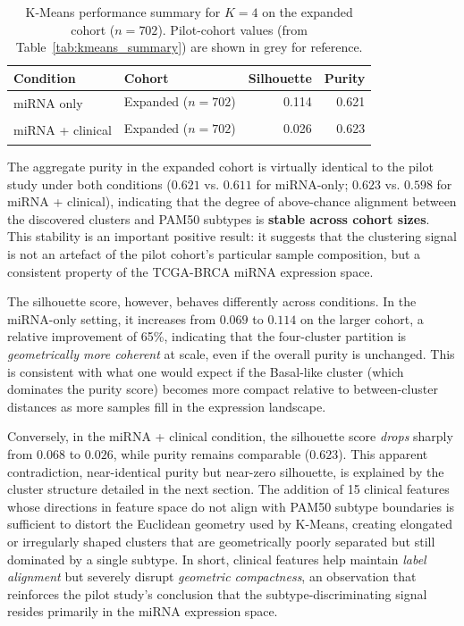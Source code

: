 \begin{table}[!ht]
\centering
\caption{K-Means performance summary for $K = 4$ on the expanded cohort ($n = 702$).
Pilot-cohort values (from Table~\ref{tab:kmeans_summary}) are shown in grey for
reference.}
\label{tab:kmeans_expanded_summary}
\begin{tabular}{llrr}
\hline
\textbf{Condition} & \textbf{Cohort} & \textbf{Silhouette} & \textbf{Purity} \\
\hline
\multirow{2}{*}{miRNA only}
  & Expanded ($n = 702$) & 0.114 & 0.621 \\
  & \color{gray}{Pilot ($n = 244$)}  & \color{gray}{0.069} & \color{gray}{0.611} \\
\hline
\multirow{2}{*}{miRNA + clinical}
  & Expanded ($n = 702$) & 0.026 & 0.623 \\
  & \color{gray}{Pilot ($n = 244$)}  & \color{gray}{0.068} & \color{gray}{0.598} \\
\hline
\end{tabular}
\end{table}


The aggregate purity in the expanded cohort is virtually identical to the pilot
study under both conditions ($0.621$ vs. $0.611$ for miRNA-only; $0.623$ vs.
$0.598$ for miRNA + clinical), indicating that the degree of above-chance alignment
between the discovered clusters and PAM50 subtypes is \textbf{stable across cohort
sizes}. This stability is an important positive result: it suggests that the
clustering signal is not an artefact of the pilot cohort's particular sample
composition, but a consistent property of the TCGA-BRCA miRNA expression space.

The silhouette score, however, behaves differently across conditions. In the
miRNA-only setting, it increases from $0.069$ to $0.114$ on the larger cohort, 
a relative improvement of 65\%, indicating that the four-cluster partition is
\textit{geometrically more coherent} at scale, even if the overall purity is
unchanged. This is consistent with what one would expect if the Basal-like cluster
(which dominates the purity score) becomes more compact relative to between-cluster
distances as more samples fill in the expression landscape.

Conversely, in the miRNA + clinical condition, the silhouette score \textit{drops}
sharply from $0.068$ to $0.026$, while purity remains comparable ($0.623$). This
apparent contradiction, near-identical purity but near-zero silhouette, is
explained by the cluster structure detailed in the next section. The addition of 15
clinical features whose directions in feature space do not align with PAM50 subtype
boundaries is sufficient to distort the Euclidean geometry used by K-Means, creating
elongated or irregularly shaped clusters that are geometrically poorly separated but
still dominated by a single subtype. In short, clinical features help maintain
\textit{label alignment} but severely disrupt \textit{geometric compactness}, an
observation that reinforces the pilot study's conclusion that the
subtype-discriminating signal resides primarily in the miRNA expression space.

